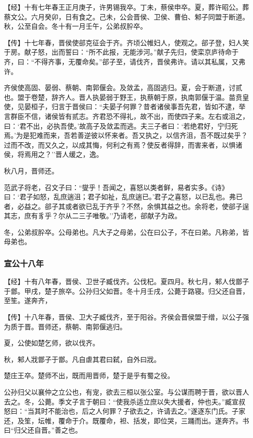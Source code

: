 \documentclass[]{article}
\begin{document}
【经】十有七年春王正月庚子，许男锡我卒。丁未，蔡侯申卒。夏，葬许昭公。葬蔡文公。六月癸卯，日有食之。己未，公会晋侯、卫侯、曹伯、邾子同盟于断道。秋，公至自会。冬十有一月壬午，公弟叔肸卒。

【传】十七年春，晋侯使郤克征会于齐。齐顷公帷妇人，使观之。郤子登，妇人笑于房。献子怒，出而誓曰：``所不此报，无能涉河。''献子先归，使栾京庐待命于齐，曰：``不得齐事，无覆命矣。''郤子至，请伐齐，晋侯弗许。请以其私属，又弗许。

齐侯使高固、晏弱、蔡朝、南郭偃会。及敛孟，高固逃归。夏，会于断道，讨贰也。盟于卷楚，辞齐人。晋人执晏弱于野王，执蔡朝于原，执南郭偃于温。苗贲皇使，见晏桓子，归言于晋侯曰：``夫晏子何罪？昔者诸侯事吾先君，皆如不逮，举言群臣不信，诸侯皆有贰志。齐君恐不得礼，故不出，而使四子来。左右或沮之，曰：`君不出，必执吾使。'故高子及敛盂而逃。夫三子者曰：`若绝君好，宁归死焉。'为是犯难而来，吾若善逆彼以怀来者。吾又执之，以信齐沮，吾不既过矣乎？过而不改，而又久之，以成其悔，何利之有焉？使反者得辞，而害来者，以惧诸侯，将焉用之？''晋人缓之，逸。

秋八月，晋师还。

范武子将老，召文子曰：``燮乎！吾闻之，喜怒以类者鲜，易者实多。《诗》曰：`君子如怒，乱庶遄沮；君子如祉，乱庶遄已。'君子之喜怒，以已乱也。弗已者，必益之。郤子其或者欲已乱于齐乎？不然，余惧其益之也。余将老，使郤子逞其志，庶有豸乎？尔从二三子唯敬。''乃请老，郤献子为政。

冬，公弟叔肸卒。公母弟也。凡大子之母弟，公在曰公子，不在曰弟。凡称弟，皆母弟也。

\hypertarget{header-n1500}{%
\subsubsection{宣公十八年}\label{header-n1500}}

【经】十有八年春，晋侯、卫世子臧伐齐。公伐杞。夏四月。秋七月，邾人伐鄫子于鄫。甲戌，楚子旅卒。公孙归父如晋。冬十月壬戌，公薨于路寝。归父还自晋，至笙。遂奔齐，

【传】十八年春，晋侯、卫大子臧伐齐，至于阳谷。齐侯会晋侯盟于缯，以公子强为质于晋。晋师还，蔡朝、南郭偃逃归。

夏，公使如楚乞师，欲以伐齐。

秋，邾人戕鄫子于鄫。凡自虐其君曰弑，自外曰戕。

楚庄王卒。楚师不出，既而用晋师，楚于是乎有蜀之役。

公孙归父以襄仲之立公也，有宠，欲去三桓以张公室。与公谋而聘于晋，欲以晋人去之。冬，公薨。季文子言于朝曰：``使我杀适立庶以失大援者，仲也夫。''臧宣叔怒曰：``当其时不能治也，后之人何罪？子欲去之，许请去之。''遂逐东门氏。子家还，及笙，坛帷，覆命于介。既覆命，袒、括发，即位哭，三踊而出。遂奔齐。书曰``归父还自晋。''善之也。
\end{document}
